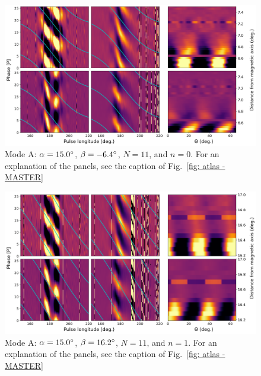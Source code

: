 \begin{figure}
	\begin{center}
		\includegraphics[width=\atlasHeightFrac\textwidth]{Figures/B0031/atlas/A_517015011000_plots}
		\caption[Atlas results: Mode A -- $\alpha=15.0\degr$, $\beta=-6.4\degr$, $N=11$, $n=0$]{Mode A: $\alpha=15.0\degr$, $\beta=-6.4\degr$, $N=11$, and $n=0$. For an explanation of the panels, see the caption of Fig.~\ref{fig: atlas - MASTER} }
		\label{fig: atlas - A_517015011000}
	\end{center}
\end{figure}

\begin{figure}
	\begin{center}
		\includegraphics[width=\atlasHeightFrac\textwidth]{Figures/B0031/atlas/A_517015011001_plots}
		\caption[Atlas results: Mode A -- $\alpha=15.0\degr$, $\beta=16.2\degr$, $N=11$, $n=1$]{Mode A: $\alpha=15.0\degr$, $\beta=16.2\degr$, $N=11$, and $n=1$. For an explanation of the panels, see the caption of Fig.~\ref{fig: atlas - MASTER} }
		\label{fig: atlas - A_517015011001}
	\end{center}
\end{figure}

